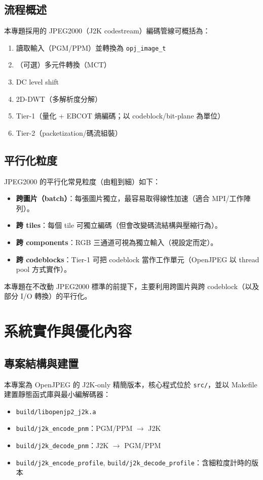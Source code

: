 \documentclass[UTF8,a4paper,12pt]{ctexart}
\begin{document}
\subsection{流程概述}
本專題採用的 JPEG2000（J2K codestream）編碼管線可概括為：
\begin{enumerate}[label=(\arabic*)]
  \item 讀取輸入（PGM/PPM）並轉換為 \texttt{opj\_image\_t}
  \item（可選）多元件轉換（MCT）
  \item DC level shift
  \item 2D-DWT（多解析度分解）
  \item Tier-1（量化 + EBCOT 熵編碼；以 codeblock/bit-plane 為單位）
  \item Tier-2（packetization/碼流組裝）
\end{enumerate}

\subsection{平行化粒度}
JPEG2000 的平行化常見粒度（由粗到細）如下：
\begin{itemize}
  \item \textbf{跨圖片（batch）}：每張圖片獨立，最容易取得線性加速（適合 MPI/工作陣列）。
  \item \textbf{跨 tiles}：每個 tile 可獨立編碼（但會改變碼流結構與壓縮行為）。
  \item \textbf{跨 components}：RGB 三通道可視為獨立輸入（視設定而定）。
  \item \textbf{跨 codeblocks}：Tier-1 可把 codeblock 當作工作單元（OpenJPEG 以 thread pool 方式實作）。
\end{itemize}

本專題在不改動 JPEG2000 標準的前提下，主要利用跨圖片與跨 codeblock（以及部分 I/O 轉換）的平行化。

\section{系統實作與優化內容}
\subsection{專案結構與建置}
本專案為 OpenJPEG 的 J2K-only 精簡版本，核心程式位於 \texttt{src/}，並以 Makefile 建置靜態函式庫與最小編解碼器：
\begin{itemize}
  \item \texttt{build/libopenjp2\_j2k.a}
  \item \texttt{build/j2k\_encode\_pnm}：PGM/PPM $\rightarrow$ J2K
  \item \texttt{build/j2k\_decode\_pnm}：J2K $\rightarrow$ PGM/PPM
  \item \texttt{build/j2k\_encode\_profile}, \texttt{build/j2k\_decode\_profile}：含細粒度計時的版本
\end{itemize}
\end{document}
